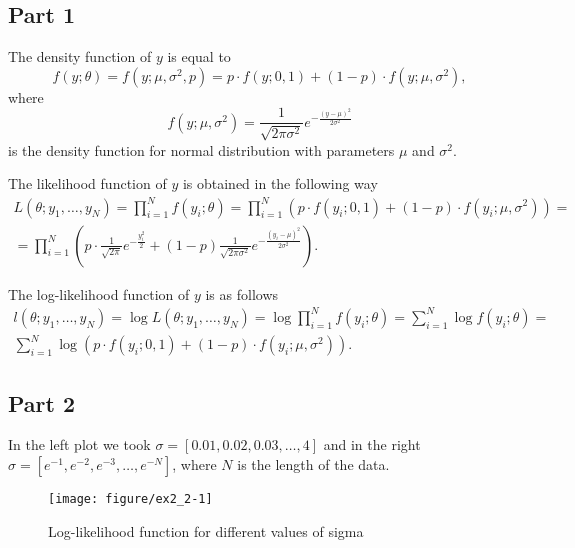 \documentclass[12pt, a4paper]{article}\usepackage[]{graphicx}\usepackage[]{color}
\makeatletter
\def\maxwidth{ %
  \ifdim\Gin@nat@width>\linewidth
    \linewidth
  \else
    \Gin@nat@width
  \fi
}
\newenvironment{knitrout}{}{} %
\makeatother
\begin{document}
\subsection{Part 1}
The density function of $y$ is equal to
\[ f(y; \theta) = f(y; \mu, \sigma^2, p) = p\cdot  f(y; 0, 1) + (1-p) \cdot  f(y; \mu, \sigma^2), \]
where 
\[ f(y; \mu, \sigma^2) = \frac{1}{\sqrt{2\pi\sigma^2}} e^{-\frac{(y-\mu)^2}{2\sigma^2}} \]
is the density function for normal distribution with parameters $\mu$ and $\sigma^2$.


The likelihood function of $y$ is obtained in the following way
\begin{gather*} 
  L(\theta; y_1,\dots,y_N) = \prod_{i=1}^N f(y_i; \theta) = \prod_{i=1}^N  \left(  p\cdot  f(y_i; 0, 1) + (1-p) \cdot  f(y_i; \mu, \sigma^2) \right) = \\
  = \prod_{i=1}^N \left(  p\cdot  \frac{1}{\sqrt{2\pi}} e^{-\frac{y_i^2}{2}} + (1-p)\frac{1}{\sqrt{2\pi\sigma^2}} e^{-\frac{(y_i-\mu)^2}{2\sigma^2}}  \right).
\end{gather*}

The log-likelihood function of $y$ is as follows
\begin{gather*} 
  l(\theta; y_1,\dots,y_N) = \log{L(\theta; y_1,\dots,y_N)} = \log \prod_{i=1}^N f(y_i; \theta) = \sum_{i=1}^N \log f(y_i; \theta) = \\
  \sum_{i=1}^N \log \left(  p\cdot  f(y_i; 0, 1) + (1-p) \cdot  f(y_i; \mu, \sigma^2) \right).
\end{gather*}

\subsection{Part 2}
In the left plot we took $\sigma = [0.01,0.02,0.03,\dots,4]$ and in the right $\sigma = [e^{-1}, e^{-2}, e^{-3},\dots, e^{-N}]$, where $N$ is the length of the data.
\begin{knitrout}
\color{fgcolor}\begin{figure}[H]

{\centering \texttt{[image: figure/ex2\_2-1]} 

}

\caption[Log-likelihood function for different values of sigma]{Log-likelihood function for different values of sigma}\label{fig:ex2.2}
\end{figure}


\end{knitrout}
\end{document}
